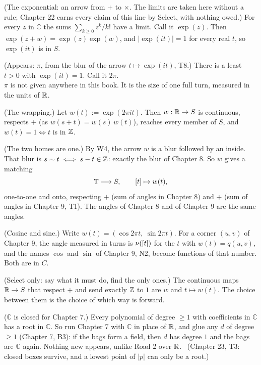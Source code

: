 \begin{lines}
\item[\lab{T5}] (The exponential: an arrow from $+$ to $\times$. The limits are taken here without a rule; Chapter 22 earns every claim of this line by Select, with nothing owed.) For every $z$ in $\mathbb{C}$ the sums $\sum_{k \ge 0} z^k / k!$ have a limit. Call it $\exp(z)$. Then $\exp(z + w) = \exp(z)\exp(w)$, and $|\exp(i t)| = 1$ for every real $t$, so $\exp(i t)$ is in $S$.
\item[\lab{T6}] (Appears: $\pi$, from the blur of the arrow $t \mapsto \exp(it)$, T8.) There is a least $t > 0$ with $\exp(i t) = 1$. Call it $2\pi$. \\
$\pi$ is not given anywhere in this book. It is the size of one full turn, measured in the units of $\mathbb{R}$.
\item[\lab{T7}] (The wrapping.) Let $w(t) := \exp(2\pi i t)$. Then $w : \mathbb{R} \to S$ is continuous, respects $+$ (as $w(s + t) = w(s)\,w(t)$), reaches every member of $S$, and $w(t) = 1 \iff t$ is in $\mathbb{Z}$.
\item[\lab{T8}] (The two homes are one.) By W4, the arrow $w$ is a blur followed by an inside. That blur is $s \sim t \iff s - t \in \mathbb{Z}$: exactly the blur of Chapter 8. So $w$ gives a matching
\[
\mathbb{T} \longrightarrow S, \qquad [t] \mapsto w(t),
\]
one-to-one and onto, respecting $+$ (sum of angles in Chapter 8) and $+$ (sum of angles in Chapter 9, T1). The angles of Chapter 8 and of Chapter 9 are the same angles.
\item[\lab{T9}] (Cosine and sine.) Write $w(t) = (\cos 2\pi t,\ \sin 2\pi t)$. For a corner $(u, v)$ of Chapter 9, the angle measured in turns is $\nu([t])$ for the $t$ with $w(t) = q(u,v)$, and the names $\cos$ and $\sin$ of Chapter 9, N2, become functions of that number. Both are in $C$.
\item[\lab{T10}] (Select only: say what it must do, find the only ones.) The continuous maps $\mathbb{R} \to S$ that respect $+$ and send exactly $\mathbb{Z}$ to $1$ are $w$ and $t \mapsto \overline{w(t)}$. The choice between them is the choice of which way is forward.
\item[\lab{T11}] ($\mathbb{C}$ is closed for Chapter 7.) Every polynomial of degree $\ge 1$ with coefficients in $\mathbb{C}$ has a root in $\mathbb{C}$. So run Chapter 7 with $\mathbb{C}$ in place of $\mathbb{R}$, and glue any $d$ of degree $\ge 1$ (Chapter 7, B3): if the bags form a field, then $d$ has degree $1$ and the bags are $\mathbb{C}$ again. Nothing new appears, unlike Road 2 over $\mathbb{R}$. \ (Chapter 23, T3: closed boxes survive, and a lowest point of $|p|$ can only be a root.)
\end{lines}

